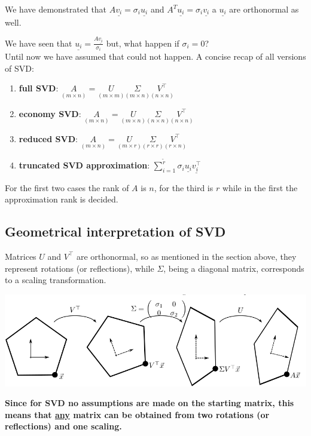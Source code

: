 We have demonstrated that $A\underline{v_i} = \sigma_i \underline{u_i}$ and $A^T\underline{u_i} = \sigma_i \underline{v_i}$ a $\underline{u_i}$ are orthonormal as well. 

We have seen that $\underline{u_i} = \frac{A\underline{v_i}}{\sigma_i}$ but, what happen if $\sigma_i = 0$?\\
Until now we have assumed that could not happen.
A concise recap of all versions of SVD:
\begin{enumerate}
    \item \textbf{full SVD}: $\underset{(m \times n)}{A} = \underset{(m \times m)}{U}\underset{(m \times n)}{\Sigma}\underset{(n \times n)}{V^\intercal}$
    \item \textbf{economy SVD}: $\underset{(m \times n)}{A} = \underset {(m \times n)}{U}\underset{(n \times n)}{\Sigma}\underset{(n \times n)}{V^\intercal}$
    \item \textbf{reduced SVD}: $\underset{(m \times n)}{A} = \underset{(m \times r)}{U}\underset{(r \times r)}{\Sigma}\underset{(r \times n)}{V^\intercal}$
    \item \textbf{truncated SVD approximation}: $\sum\limits_{i=1}^{\tilde{r}} \sigma_i\underline{u_i}\underline{v_i^\intercal}$
\end{enumerate}
For the first two cases the rank of $A$ is $n$, for the third is $r$ while in the first the approximation rank is decided.

\subsection*{Geometrical interpretation of SVD}
Matrices \( U \) and \( V^\intercal \) are orthonormal, so as mentioned in the section above, they represent rotations (or reflections), while \( \Sigma \), being a diagonal matrix, corresponds to a scaling transformation. 
\begin{center}
    \includegraphics[scale=0.4]{../images/SVD_Geometric_Interpretation.png}
\end{center}
\textbf{Since for SVD no assumptions are made on the starting matrix, this means that \underline{any} matrix can be obtained from two rotations (or reflections) and one scaling.}


